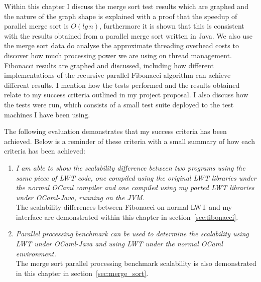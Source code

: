 \documentclass[12pt,twoside,notitlepage]{report}
\begin{document}
%
%

%
%

Within this chapter I discuss the merge sort test results which are graphed and the nature of the graph shape is explained with a proof that the speedup of parallel merge sort is $O(lg\,n)$, furthermore it is shown that this is
consistent with the results obtained from a parallel merge sort written in Java. We also use the merge sort data do analyse the approximate threading overhead costs to discover how much processing power we are using on thread
management. Fibonacci results are graphed and discussed, including how different implementations of the recursive parallel Fibonacci algorithm can achieve different results. I mention how the tests performed and the results obtained
relate to my success criteria outlined in my project proposal. I also discuss how the tests were run, which consists of a small test suite deployed to the test machines I have been using. 

The following evaluation demonstrates that my success criteria has been achieved. Below is a reminder of these criteria with a small summary of how each criteria has been achieved:

\begin{enumerate}
\item {\em I am able to show the scalability difference between two programs using the same piece of LWT code, one compiled using the original LWT libraries under the normal OCaml compiler and one compiled using my ported LWT libraries
under OCaml-Java, running on the JVM.}\hfill \\
The scalability differences between Fibonacci on normal LWT and my interface are demonstrated within this chapter in section~\ref{sec:fibonacci}.
\item {\em Parallel processing benchmark can be used to determine the scalability using LWT under OCaml-Java and using LWT under the normal OCaml environment.}\hfill \\
The merge sort parallel processing benchmark scalability is also demonstrated in this chapter in section~\ref{sec:merge_sort}.
\end{enumerate}

%
%
\end{document}
